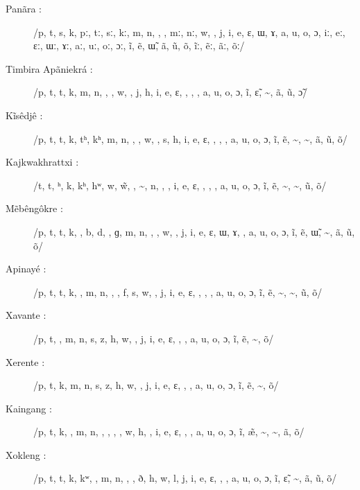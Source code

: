 \documentclass[output=paper,hidelinks]{langscibook}
\begin{document}
\begin{description}
\item[Panãra \normalfont\citep{Lapierre2019}:]
/p, t, s, k, pː, tː, sː, kː, m, n, \textltailn, {\NG}, mː, nː, w, \textfishhookr, j, i, e, ɛ, ɯ, ɤ, a, u, o, ɔ, iː, eː, ɛː, ɯː, ɤː, aː, uː, oː, ɔː, \~i, \~e, \~ɯ, \~a, \~u, \~o, \~iː, \~eː, \~aː, \~oː/

\item[{Timbira Ap\~aniekr\'a} \normalfont\citep{Alves1999, Alves2004}:]
/p, t, t\textesh, k, m, n, \textltailn, {\NG}, w, \textfishhookr, j, h, i, e, ɛ, \textbari, \textschwa, \textrevepsilon, a, u, o, ɔ, \~i, \~ɛ, \~\textbari, \~a, \~u, \~ɔ/

\item[{K\~is\^edj\^e} \normalfont\citep{Nonato2014}:] 
/p, t, t\textesh, k, tʰ, kʰ, m, n, \textltailn, {\NG}, w, \textfishhookr, s, h, i, e, ɛ, \textbari, \textschwa, \textrevepsilon, a, u, o, ɔ, \~i, \~e, \~\textbari, \~\textschwa, \~a, \~u, \~o/

\item[Kajkwakhrattxi \normalfont\citep{Camargo2010, Beauchamp2019}:]
/t, t\textctc, \textrtailt ʰ, k, kʰ, hʷ, w, \~w, \textrtailr, \~\textrtailr, n, \textltailn, {\NG}, i, e, ɛ, \textbari, \textschwa, \textturnv, a, u, o, ɔ, \~i, \~e, \~\textbari, \~\textturna, \~u, \~o/

\item[{M\~eb\^eng\^okre} \normalfont\citep{Salanova2001, SalanovaReisSilva2011}:]
/p, t, t\textesh, k, \textglotstop, b, d, \textdyoghlig, ɡ, m, n, \textltailn, {\NG}, w, \textfishhookr, j, i, e, ɛ, ɯ, ɤ, \textturnv, a, u, o, ɔ, \~i, \~e, \~ɯ, \~\textturnv, \~a, \~u, \~o/

\item[{Apinay\'e} \normalfont\citep{DeOliveira2005, Albuquerque2007}:]
/p, t, t\textesh, k, \textglotstop, m, n, \textltailn, {\NG}, f, s, w, \textfishhookr, j, i, e, ɛ, \textbari, \textschwa, \textturnv, a, u, o, ɔ, \~i, \~e, \~\textbari, \~\textschwa, \~u, \~o/

\item[Xavante \normalfont\citep{Quintino2000, Estevam2011}:]
/p, t, \textglotstop, m, n, s, z, h, w, \textfishhookr, j, i, e, ɛ, \textbari, \textschwa, a, u, o, ɔ, \~i, \~e, \~\textturna, \~o/

\item[Xerente \normalfont\citep{deSouza2008}:]
/p, t, k, m, n, s, z, h, w, \textfishhookr, j, i, e, ɛ, \textbari, \textschwa, a, u, o, ɔ, \~i, \~e, \~\textschwa, \~o/

\item[Kaingang \normalfont\citep{Wiesemann1972}:]
/p, t, k, \textglotstop, m, n, \textltailn, {\NG}, \textphi, \textesh, w, h, \textfishhookr, i, e, ɛ, \textbari, \textschwa, a, u, o, ɔ, \~i, \~\ae, \~\textbari, \~\textschwa, \~a, \~o/

\item[Xokleng \normalfont\citep{Gakran2005, Gakran2015}:]
/p, t, t\textesh, k, kʷ, \textglotstop, m, n, \textltailn, {\NG}, ð, h, w, l, j, i, e, ɛ, \textbari, \textschwa, a, u, o, ɔ, \~i, \~ɛ, \~\textbari, \~a, \~u, \~o/

\end{description}

{\sloppy\printbibliography[heading=subbibliography,notkeyword=this]}
\end{document}
